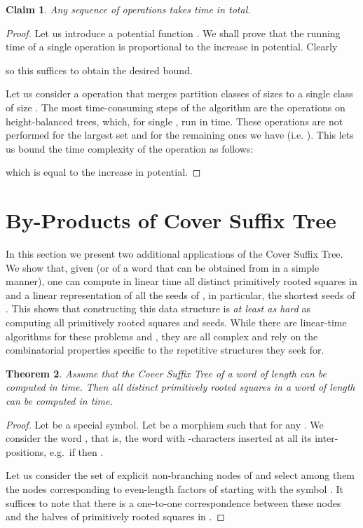 \documentclass{article}
\theoremstyle{theorem}
\newtheorem{theorem}{Theorem}
\newtheorem{claim}[theorem]{Claim}
\theoremstyle{definition}
\begin{document}
  \begin{claim}
    Any sequence of  operations takes  time in total.
  \end{claim}
  \begin{proof}
    Let us introduce a potential function .
    We shall prove that the running time of a single  operation
    is proportional to the increase in potential.
    Clearly 
    
    so this suffices to obtain the desired  bound.
    
    Let us consider a  operation that merges partition classes of sizes
     to a single class of size .
    The most time-consuming steps of the algorithm are the operations on
    height-balanced trees, which, for single , run in  time. 
    These operations are not performed
    for the largest set and for the remaining ones we have 
    (i.e. ). This lets us bound the time complexity
    of the  operation as follows:
    
    which is equal to the increase in potential.
  \end{proof}




  \section{By-Products of Cover Suffix Tree}\label{sec:by-products}
  In this section we present two additional applications of the Cover Suffix Tree.
  We show that, given  (or  of a word that can be obtained from 
  in a simple manner), one can compute in linear time all distinct primitively rooted squares
  in  and a linear representation of all the seeds of , in particular, the shortest
  seeds of .
  This shows that constructing this data structure is \emph{at least as hard}
  as computing all primitively rooted squares and seeds. While there are linear-time algorithms
  for these problems \cite{DBLP:journals/jcss/GusfieldS04,DBLP:conf/focs/KolpakovK99,Crochemore2013} and \cite{DBLP:conf/soda/KociumakaKRRW12}, they
  are all complex and rely on the combinatorial properties specific to the repetitive structures they seek for.
  

  \begin{theorem}
    Assume that the Cover Suffix Tree of a word of length  can be computed in  time.
    Then all distinct primitively rooted squares in a word  of length  can be computed in
     time.
  \end{theorem}
  \begin{proof}
    Let  be a special symbol.
    Let  be a morphism such that
     for any .
    We consider the word , that is, the word  with -characters
    inserted at all its inter-positions, e.g.\ if  then .
    
    Let us consider the set of explicit non-branching nodes of 
    and select among them the nodes corresponding to even-length factors of 
    starting with the symbol .
    It suffices to note that there is a one-to-one correspondence between these
    nodes and the halves of primitively rooted squares in .
  \end{proof}
\end{document}
